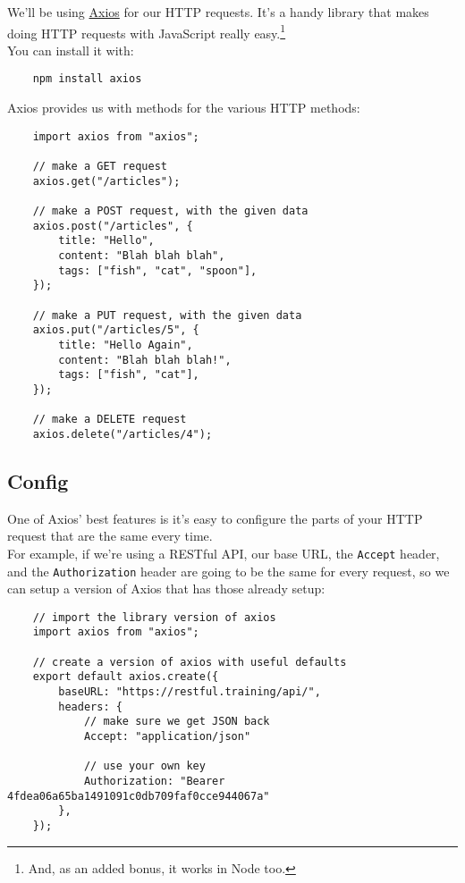 We'll be using \href{https://github.com/mzabriskie/axios}{Axios} for our HTTP requests. It's a handy library that makes doing HTTP requests with JavaScript really easy.\footnote{And, as an added bonus, it works in Node too.}
\\

You can install it with:

\begin{verbatim}
    npm install axios
\end{verbatim}

Axios provides us with methods for the various HTTP methods:

\begin{verbatim}
    import axios from "axios";

    // make a GET request
    axios.get("/articles");

    // make a POST request, with the given data
    axios.post("/articles", {
        title: "Hello",
        content: "Blah blah blah",
        tags: ["fish", "cat", "spoon"],
    });

    // make a PUT request, with the given data
    axios.put("/articles/5", {
        title: "Hello Again",
        content: "Blah blah blah!",
        tags: ["fish", "cat"],
    });

    // make a DELETE request
    axios.delete("/articles/4");
\end{verbatim}


\subsection{Config}

One of Axios' best features is it's easy to configure the parts of your HTTP request that are the same every time.
\\

For example, if we're using a RESTful API, our base URL, the \texttt{Accept} header, and the \texttt{Authorization} header are going to be the same for every request, so we can setup a version of Axios that has those already setup:

\begin{verbatim}
    // import the library version of axios
    import axios from "axios";

    // create a version of axios with useful defaults
    export default axios.create({
        baseURL: "https://restful.training/api/",
        headers: {
            // make sure we get JSON back
            Accept: "application/json"

            // use your own key
            Authorization: "Bearer 4fdea06a65ba1491091c0db709faf0cce944067a"
        },
    });
\end{verbatim}

